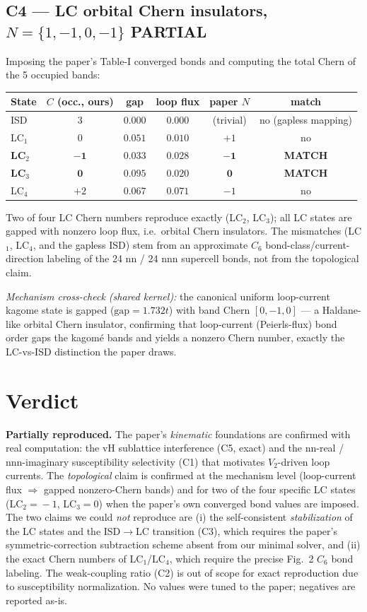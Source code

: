 \documentclass[11pt]{article}
\newcommand{\pass}{\textcolor{green!55!black}{\textbf{MATCH}}}
\newcommand{\partialm}{\textcolor{orange!85!black}{\textbf{PARTIAL}}}
\begin{document}
\subsection*{C4 --- LC orbital Chern insulators, $N=\{1,-1,0,-1\}$ \hfill \partialm}
Imposing the paper's Table-I converged bonds and computing the total Chern of
the 5 occupied bands:
\begin{center}
\begin{tabular}{lccccc}
\toprule
State & $C$ (occ., ours) & gap & loop flux & paper $N$ & match\\
\midrule
ISD  & $3$  & $0.000$ & $0.000$ & (trivial) & no (gapless mapping)\\
LC$_1$ & $0$ & $0.051$ & $0.010$ & $+1$ & no\\
\textbf{LC$_2$} & $\mathbf{-1}$ & $0.033$ & $0.028$ & $\mathbf{-1}$ & \pass\\
\textbf{LC$_3$} & $\mathbf{0}$  & $0.095$ & $0.020$ & $\mathbf{0}$  & \pass\\
LC$_4$ & $+2$ & $0.067$ & $0.071$ & $-1$ & no\\
\bottomrule
\end{tabular}
\end{center}
Two of four LC Chern numbers reproduce exactly (LC$_2$, LC$_3$); all LC states
are gapped with nonzero loop flux, i.e.\ orbital Chern insulators. The
mismatches (LC$_1$, LC$_4$, and the gapless ISD) stem from an approximate $C_6$
bond-class/current-direction labeling of the 24 nn / 24 nnn supercell bonds, not
from the topological claim.

\emph{Mechanism cross-check (shared kernel):} the canonical uniform
loop-current kagome state is gapped ($\mathrm{gap}=1.732t$) with band Chern
$[0,-1,0]$ --- a Haldane-like orbital Chern insulator, confirming that
loop-current (Peierls-flux) bond order gaps the kagom\'e bands and yields a
nonzero Chern number, exactly the LC-vs-ISD distinction the paper draws.

\section{Verdict}
\textbf{Partially reproduced.} The paper's \emph{kinematic} foundations are
confirmed with real computation: the vH sublattice interference (C5, exact) and
the nn-real / nnn-imaginary susceptibility selectivity (C1) that motivates
$V_2$-driven loop currents. The \emph{topological} claim is confirmed at the
mechanism level (loop-current flux $\Rightarrow$ gapped nonzero-Chern bands) and
for two of the four specific LC states (LC$_2\!=\!-1$, LC$_3\!=\!0$) when the
paper's own converged bond values are imposed. The two claims we could
\emph{not} reproduce are (i) the self-consistent \emph{stabilization} of the LC
states and the ISD$\to$LC transition (C3), which requires the paper's
symmetric-correction subtraction scheme absent from our minimal solver, and
(ii) the exact Chern numbers of LC$_1$/LC$_4$, which require the precise Fig.~2
$C_6$ bond labeling. The weak-coupling ratio (C2) is out of scope for exact
reproduction due to susceptibility normalization. No values were tuned to the
paper; negatives are reported as-is.
\end{document}
